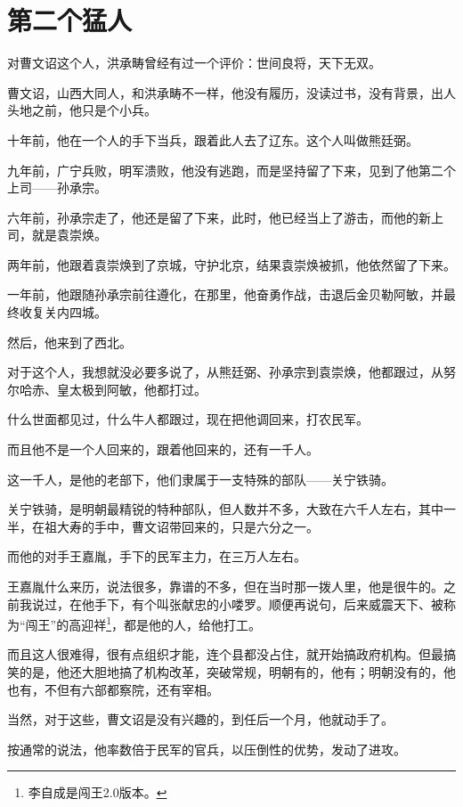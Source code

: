 \section{第二个猛人}
\ifnum{}
	\begin{multicols}{\theparacolNo}
		\fi
		对曹文诏这个人，洪承畴曾经有过一个评价：世间良将，天下无双。

		曹文诏，山西大同人，和洪承畴不一样，他没有履历，没读过书，没有背景，出人头地之前，他只是个小兵。

		十年前，他在一个人的手下当兵，跟着此人去了辽东。这个人叫做熊廷弼。

		九年前，广宁兵败，明军溃败，他没有逃跑，而是坚持留了下来，见到了他第二个上司——孙承宗。

		六年前，孙承宗走了，他还是留了下来，此时，他已经当上了游击，而他的新上司，就是袁崇焕。

		两年前，他跟着袁崇焕到了京城，守护北京，结果袁崇焕被抓，他依然留了下来。

		一年前，他跟随孙承宗前往遵化，在那里，他奋勇作战，击退后金贝勒阿敏，并最终收复关内四城。

		然后，他来到了西北。

		对于这个人，我想就没必要多说了，从熊廷弼、孙承宗到袁崇焕，他都跟过，从努尔哈赤、皇太极到阿敏，他都打过。

		什么世面都见过，什么牛人都跟过，现在把他调回来，打农民军。

		而且他不是一个人回来的，跟着他回来的，还有一千人。

		这一千人，是他的老部下，他们隶属于一支特殊的部队——关宁铁骑。

		关宁铁骑，是明朝最精锐的特种部队，但人数并不多，大致在六千人左右，其中一半，在祖大寿的手中，曹文诏带回来的，只是六分之一。

		而他的对手王嘉胤，手下的民军主力，在三万人左右。

		王嘉胤什么来历，说法很多，靠谱的不多，但在当时那一拨人里，他是很牛的。之前我说过，在他手下，有个叫张献忠的小喽罗。顺便再说句，后来威震天下、被称为“闯王”的高迎祥\footnote{李自成是闯王2.0版本。}，都是他的人，给他打工。

		而且这人很难得，很有点组织才能，连个县都没占住，就开始搞政府机构。但最搞笑的是，他还大胆地搞了机构改革，突破常规，明朝有的，他有；明朝没有的，他也有，不但有六部都察院，还有宰相。

		当然，对于这些，曹文诏是没有兴趣的，到任后一个月，他就动手了。

		按通常的说法，他率数倍于民军的官兵，以压倒性的优势，发动了进攻。


\end{multicols}
